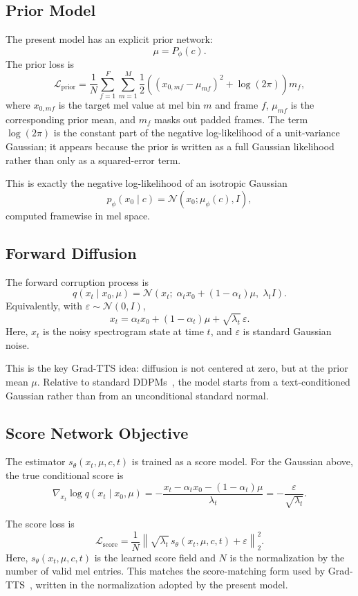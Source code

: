 \documentclass[11pt,a4paper]{article}
\begin{document}
\subsection{Prior Model}

The present model has an explicit prior network:
\[
\mu = P_{\phi}(c).
\]
The prior loss is
\[
\mathcal{L}_{\text{prior}}
= \frac{1}{N}
\sum_{f=1}^{F}\sum_{m=1}^{M}
\frac{1}{2}\left((x_{0,mf}-\mu_{mf})^2 + \log(2\pi)\right)m_f,
\]
where $x_{0,mf}$ is the target mel value at mel bin $m$ and frame $f$, $\mu_{mf}$ is the corresponding prior mean, and $m_f$ masks out padded frames. The term $\log(2\pi)$ is the constant part of the negative log-likelihood of a unit-variance Gaussian; it appears because the prior is written as a full Gaussian likelihood rather than only as a squared-error term.

This is exactly the negative log-likelihood of an isotropic Gaussian
\[
p_{\phi}(x_0 \mid c) = \mathcal{N}(x_0;\mu_{\phi}(c), I),
\]
computed framewise in mel space.

\subsection{Forward Diffusion}

The forward corruption process is
\[
q(x_t \mid x_0,\mu)
=
\mathcal{N}\!\left(
x_t;\;
\alpha_t x_0 + (1-\alpha_t)\mu,\;
\lambda_t I
\right).
\]
Equivalently, with $\varepsilon\sim\mathcal{N}(0,I)$,
\[
x_t = \alpha_t x_0 + (1-\alpha_t)\mu + \sqrt{\lambda_t}\,\varepsilon.
\]
Here, $x_t$ is the noisy spectrogram state at time $t$, and $\varepsilon$ is standard Gaussian noise.

This is the key Grad-TTS idea: diffusion is not centered at zero, but at the prior mean $\mu$. Relative to standard DDPMs~\cite{ho2020ddpm}, the model starts from a text-conditioned Gaussian rather than from an unconditional standard normal.

\subsection{Score Network Objective}

The estimator $s_{\theta}(x_t,\mu,c,t)$ is trained as a score model. For the Gaussian above, the true conditional score is
\[
\nabla_{x_t} \log q(x_t \mid x_0,\mu)
=
-\frac{x_t - \alpha_t x_0 - (1-\alpha_t)\mu}{\lambda_t}
= -\frac{\varepsilon}{\sqrt{\lambda_t}}.
\]

The score loss is
\[
\mathcal{L}_{\text{score}}
= \frac{1}{N}
\left\|
\sqrt{\lambda_t}\, s_{\theta}(x_t,\mu,c,t) + \varepsilon
\right\|_2^2.
\]
Here, $s_{\theta}(x_t,\mu,c,t)$ is the learned score field and $N$ is the normalization by the number of valid mel entries.
This matches the score-matching form used by Grad-TTS~\cite{popov2021gradtts}, written in the normalization adopted by the present model.
\end{document}
